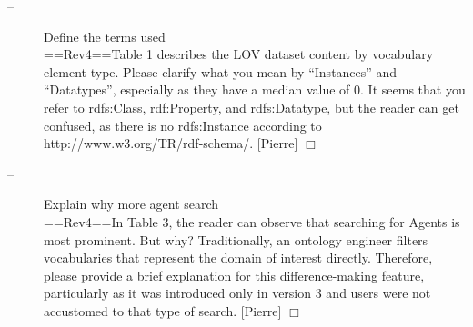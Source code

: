 \documentclass[a4paper,notitlepage]{article}
\newcommand\todo[2]{\item[--] #1 \hfill[#2] $\Box$}%
\begin{document}
\begin{description}
 \todo{Define the terms used\\
==Rev4==Table 1 describes the LOV dataset content by vocabulary element type. Please clarify what you mean by “Instances” and “Datatypes”, especially as they have a median value of 0. It seems that you refer to rdfs:Class, rdf:Property, and rdfs:Datatype, but the reader can get confused, as there is no rdfs:Instance according to http://www.w3.org/TR/rdf-schema/.}{Pierre}

 \todo{Explain why more agent search\\
==Rev4==In Table 3, the reader can observe that searching for Agents is most prominent. But why? Traditionally, an ontology engineer filters vocabularies that represent the domain of interest directly. Therefore, please provide a brief explanation for this difference-making feature, particularly as it was introduced only in version 3 and users were not accustomed to that type of search.}{Pierre}

\end{description}
\end{document}

